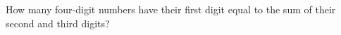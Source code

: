 How many four-digit numbers have their first digit equal to the sum of their second and third digits?
